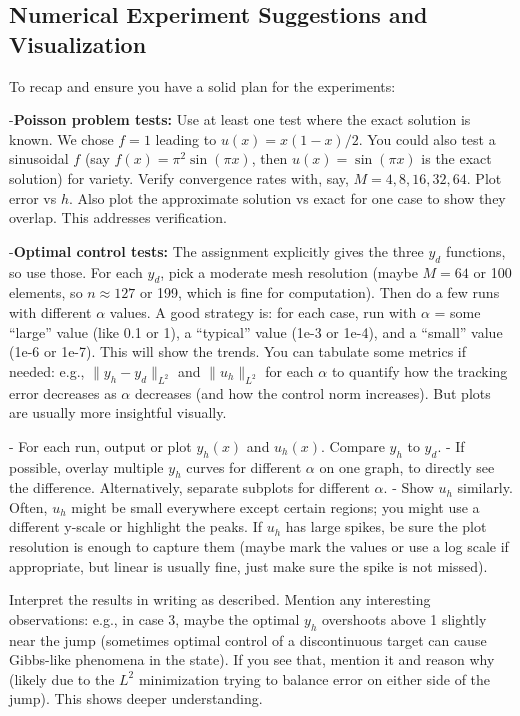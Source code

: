 \documentclass[a4paper,10pt]{report}
\begin{document}
\subsection{Numerical Experiment Suggestions and Visualization}

To recap and ensure you have a solid plan for the experiments:

-\textbf{Poisson problem tests:} Use at least one test where the exact solution is known. We chose \(f=1\) leading to \(u(x)=x(1-x)/2\). You could also test a sinusoidal \(f\) (say \(f(x)=\pi^2 \sin(\pi x)\), then \(u(x)=\sin(\pi x)\) is the exact solution) for variety. Verify convergence rates with, say, \(M=4,8,16,32,64\). Plot error vs \(h\). Also plot the approximate solution vs exact for one case to show they overlap. This addresses verification.

-\textbf{Optimal control tests:} The assignment explicitly gives the three \(y_d\) functions, so use those. For each \(y_d\), pick a moderate mesh resolution (maybe \(M=64\) or 100 elements, so \(n\approx127\) or 199, which is fine for computation). Then do a few runs with different \(\alpha\) values. A good strategy is: for each case, run with \(\alpha\) = some “large” value (like 0.1 or 1), a “typical” value (1e-3 or 1e-4), and a “small” value (1e-6 or 1e-7). This will show the trends. You can tabulate some metrics if needed: e.g., \(\|y_h - y_d\|_{L^2}\) and \(\|u_h\|_{L^2}\) for each \(\alpha\) to quantify how the tracking error decreases as \(\alpha\) decreases (and how the control norm increases). But plots are usually more insightful visually.

- For each run, output or plot \(y_h(x)\) and \(u_h(x)\). Compare \(y_h\) to \(y_d\).
- If possible, overlay multiple \(y_h\) curves for different \(\alpha\) on one graph, to directly see the difference. Alternatively, separate subplots for different \(\alpha\).
- Show \(u_h\) similarly. Often, \(u_h\) might be small everywhere except certain regions; you might use a different y-scale or highlight the peaks. If \(u_h\) has large spikes, be sure the plot resolution is enough to capture them (maybe mark the values or use a log scale if appropriate, but linear is usually fine, just make sure the spike is not missed).

Interpret the results in writing as described. Mention any interesting observations: e.g., in case 3, maybe the optimal \(y_h\) overshoots above 1 slightly near the jump (sometimes optimal control of a discontinuous target can cause Gibbs-like phenomena in the state). If you see that, mention it and reason why (likely due to the \(L^2\) minimization trying to balance error on either side of the jump). This shows deeper understanding.
\end{document}
